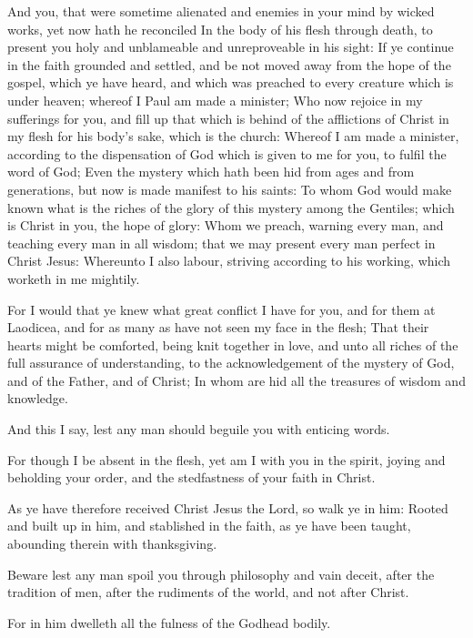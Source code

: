 \Verse And you, that were sometime alienated and enemies in your mind by wicked works, yet now hath he reconciled \Verse In the body of his flesh through death, to present you holy and unblameable and unreproveable in his sight: \Verse If ye continue in the faith grounded and settled, and be not moved away from the hope of the gospel, which ye have heard, and which was preached to every creature which is under heaven; whereof I Paul am made a minister; \Verse Who now rejoice in my sufferings for you, and fill up that which is behind of the afflictions of Christ in my flesh for his body's sake, which is the church: \Verse Whereof I am made a minister, according to the dispensation of God which is given to me for you, to fulfil the word of God; \Verse Even the mystery which hath been hid from ages and from generations, but now is made manifest to his saints: \Verse To whom God would make known what is the riches of the glory of this mystery among the Gentiles; which is Christ in you, the hope of glory: \Verse Whom we preach, warning every man, and teaching every man in all wisdom; that we may present every man perfect in Christ Jesus: \Verse Whereunto I also labour, striving according to his working, which worketh in me mightily.


\Chapter
\Verse For I would that ye knew what great conflict I have for you, and for them at Laodicea, and for as many as have not seen my face in the flesh; \Verse That their hearts might be comforted, being knit together in love, and unto all riches of the full assurance of understanding, to the acknowledgement of the mystery of God, and of the Father, and of Christ; \Verse In whom are hid all the treasures of wisdom and knowledge.

\Verse And this I say, lest any man should beguile you with enticing words.

\Verse For though I be absent in the flesh, yet am I with you in the spirit, joying and beholding your order, and the stedfastness of your faith in Christ.

\Verse As ye have therefore received Christ Jesus the Lord, so walk ye in him: \Verse Rooted and built up in him, and stablished in the faith, as ye have been taught, abounding therein with thanksgiving.

\Verse Beware lest any man spoil you through philosophy and vain deceit, after the tradition of men, after the rudiments of the world, and not after Christ.

\Verse For in him dwelleth all the fulness of the Godhead bodily.

